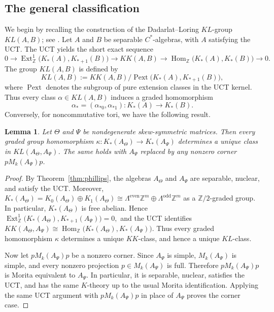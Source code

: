 \documentclass[11pt]{amsart}
\newtheorem{lemma}[theorem]{Lemma}
\theoremstyle{definition}
\theoremstyle{remark}
\begin{document}
\subsection{The general classification}

We begin by recalling the construction of the Dadarlat--Loring $KL$-group $KL(A,B)$; see
\cite{DadarlatLoring}. 
Let $A$ and $B$ be separable $C^*$-algebras, with
$A$ satisfying the UCT. The UCT yields the short exact sequence
\[
0\longrightarrow
\operatorname{Ext}^1_{\mathbb Z}\bigl(K_*(A),K_{*+1}(B)\bigr)
\longrightarrow
KK(A,B)
\longrightarrow
\operatorname{Hom}_{\mathbb Z}
\bigl(K_*(A),K_*(B)\bigr)
\longrightarrow 0.
\]
The group $KL(A,B)$ is defined by
\[
KL(A,B):=
KK(A,B)/
\operatorname{Pext}\bigl(K_*(A),K_{*+1}(B)\bigr),
\]
where $\operatorname{Pext}$ denotes the subgroup of pure extension classes in
the UCT kernel. Thus every class $\alpha\in KL(A,B)$ induces a graded homomorphism
\[\alpha_*=(\alpha_{*0},\alpha_{*1})\colon K_*(A)\to K_*(B).\]
Conversely, for noncommutative tori, we have the following result.
\begin{lemma}
\label{lem:kl}
Let $\Theta$ and $\Psi$ be nondegenerate skew-symmetric matrices. Then every graded group homomorphism $\kappa\colon K_*(A_\Theta)\to K_*(A_\Psi)$
determines a unique class in $KL(A_\Theta,A_\Psi)$. The same holds with
$A_\Psi$ replaced by any nonzero corner $pM_k(A_\Psi)p$.
\end{lemma}

\begin{proof}
By Theorem~\ref{thm:phillips}, the algebras $A_\Theta$ and $A_\Psi$ are
separable, nuclear, and satisfy the UCT. Moreover, $K_*(A_\Theta)=
K_0(A_\Theta)\oplus K_1(A_\Theta)
\cong
\Lambda^{\mathrm{even}}\mathbb Z^m
\oplus
\Lambda^{\mathrm{odd}}\mathbb Z^m$ as a $\mathbb Z/2$-graded group. In particular, $K_*(A_\Theta)$ is free
abelian. Hence $\operatorname{Ext}^1_{\mathbb Z}
\bigl(K_*(A_\Theta),K_{*+1}(A_\Psi)\bigr)=0,$
and the UCT identifies $KK(A_\Theta,A_\Psi)
\cong
\operatorname{Hom}_{\mathbb Z}
\bigl(K_*(A_\Theta),K_*(A_\Psi)\bigr).$
Thus every graded homomorphism $\kappa$ determines a unique $KK$-class, and
hence a unique $KL$-class.

Now let $pM_k(A_\Psi)p$ be a nonzero corner. Since $A_\Psi$ is simple,
$M_k(A_\Psi)$ is simple, and every nonzero projection
$p\in M_k(A_\Psi)$ is full. Therefore $pM_k(A_\Psi)p$ is Morita equivalent
to $A_\Psi$. In particular, it is separable, nuclear, satisfies the UCT, and
has the same $K$-theory up to the usual Morita identification. Applying the
same UCT argument with $pM_k(A_\Psi)p$ in place of $A_\Psi$ proves the
corner case.
\end{proof}
\end{document}
